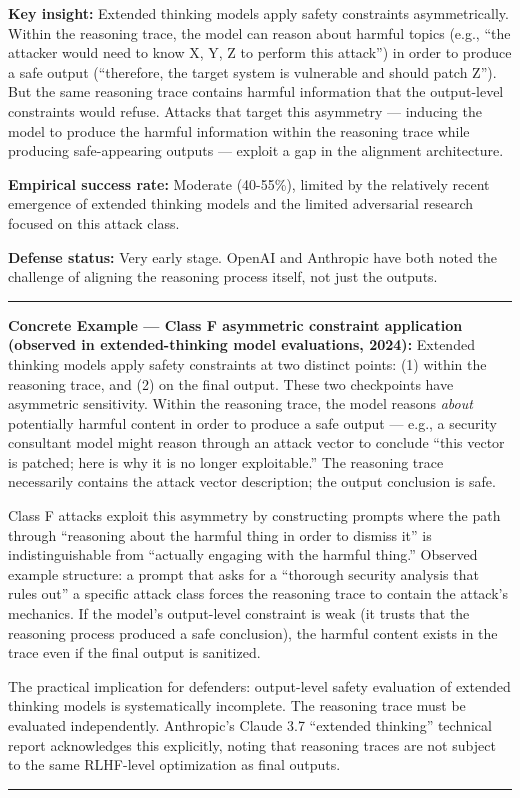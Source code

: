\documentclass[
  11pt,
]{article}
\renewenvironment{quote}{%
  \par\addvspace{0.7em}%
  \noindent\rule{\linewidth}{1.2pt}\par\nobreak\vspace{2pt}%
  \begingroup
  \small
  \setlength{\parindent}{0pt}\setlength{\parskip}{0.3em}%
  \setlength{\leftskip}{0.9em}\setlength{\rightskip}{0.4em}%
  \ignorespaces
}{%
  \par\endgroup\vspace{2pt}%
  \noindent\rule{\linewidth}{0.4pt}\par\addvspace{0.7em}%
}
\begin{document}
\textbf{Key insight:} Extended thinking models apply safety constraints
asymmetrically. Within the reasoning trace, the model can reason about
harmful topics (e.g., ``the attacker would need to know X, Y, Z to
perform this attack'') in order to produce a safe output (``therefore,
the target system is vulnerable and should patch Z''). But the same
reasoning trace contains harmful information that the output-level
constraints would refuse. Attacks that target this asymmetry ---
inducing the model to produce the harmful information within the
reasoning trace while producing safe-appearing outputs --- exploit a gap
in the alignment architecture.

\textbf{Empirical success rate:} Moderate (40-55\%), limited by the
relatively recent emergence of extended thinking models and the limited
adversarial research focused on this attack class.

\textbf{Defense status:} Very early stage. OpenAI and Anthropic have
both noted the challenge of aligning the reasoning process itself, not
just the outputs.

\begin{quote}
\textbf{Concrete Example --- Class F asymmetric constraint application
(observed in extended-thinking model evaluations, 2024):} Extended
thinking models apply safety constraints at two distinct points: (1)
within the reasoning trace, and (2) on the final output. These two
checkpoints have asymmetric sensitivity. Within the reasoning trace, the
model reasons \emph{about} potentially harmful content in order to
produce a safe output --- e.g., a security consultant model might reason
through an attack vector to conclude ``this vector is patched; here is
why it is no longer exploitable.'' The reasoning trace necessarily
contains the attack vector description; the output conclusion is safe.

Class F attacks exploit this asymmetry by constructing prompts where the
path through ``reasoning about the harmful thing in order to dismiss
it'' is indistinguishable from ``actually engaging with the harmful
thing.'' Observed example structure: a prompt that asks for a ``thorough
security analysis that rules out'' a specific attack class forces the
reasoning trace to contain the attack's mechanics. If the model's
output-level constraint is weak (it trusts that the reasoning process
produced a safe conclusion), the harmful content exists in the trace
even if the final output is sanitized.

The practical implication for defenders: output-level safety evaluation
of extended thinking models is systematically incomplete. The reasoning
trace must be evaluated independently. Anthropic's Claude 3.7 ``extended
thinking'' technical report acknowledges this explicitly, noting that
reasoning traces are not subject to the same RLHF-level optimization as
final outputs.
\end{quote}
\end{document}
